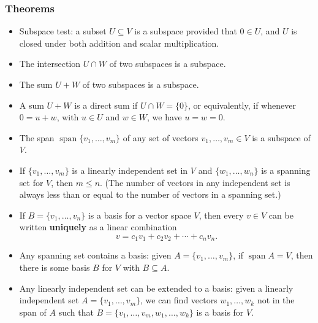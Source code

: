 \documentclass[12pt,letterpaper]{article}
\DeclareMathOperator{\spn}{span}
\begin{document}
\subsubsection*{Theorems}
\begin{itemize}
\item Subspace test: a subset $U\subseteq V$ is a subspace provided that $0\in U$, and $U$ is closed under both addition and scalar multiplication.
\item The intersection $U\cap W$ of two subspaces is a subspace.
\item The sum $U+W$ of two subspaces is a subspace.
\item A sum $U+W$ is a direct sum if $U\cap W=\{0\}$, or equivalently, if whenever $0=u+w$, with $u\in U$ and $w\in W$, we have $u=w=0$.
\item The span $\spn\{v_1,\ldots, v_m\}$ of any set of vectors $v_1,\ldots, v_m\in V$ is a subspace of $V$.
\item If $\{v_1,\ldots, v_m\}$ is a linearly independent set in $V$ and $\{w_1,\ldots, w_n\}$ is a spanning set for $V$, then $m\leq n$. (The number of vectors in any independent set is always less than or equal to the number of vectors in a spanning set.)
\item If $B=\{v_1,\ldots, v_n\}$ is a basis for a vector space $V$, then every $v\in V$ can be written {\bf uniquely} as a linear combination
\[
v=c_1v_1+c_2v_2+\cdots +c_nv_n.
\]
\item Any spanning set contains a basis: given $A=\{v_1,\ldots, v_m\}$, if $\spn A=V$, then there is some basis $B$ for $V$ with $B\subseteq A$.
\item Any linearly independent set can be extended to a basis: given a linearly independent set $A=\{v_1,\ldots, v_m\}$, we can find vectors $w_1,\ldots, w_k$ not in the span of $A$ such that $B=\{v_1,\ldots, v_m,w_1,\ldots, w_k\}$ is a basis for $V$.


\end{itemize}
\end{document}
